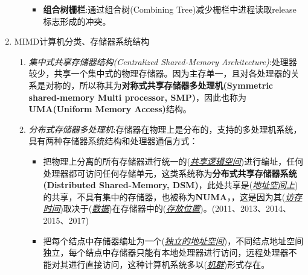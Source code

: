 \documentclass[a4paper]{ctexart}
\newcommand{\blank}[1]{(\emph{\underline{#1}})}
\begin{document}
\begin{enumerate}
\begin{enumerate}
\begin{itemize}
      \item \textbf{组合树栅栏}:通过组合树(Combining Tree)减少栅栏中进程读取release标志形成的冲突。
    \end{itemize}
  \end{enumerate}
  \item MIMD计算机分类、存储器系统结构
  \begin{enumerate}
    \item \emph{集中式共享存储器结构(Centralized Shared-Memory Architecture)}:处理器较少，共享一个集中式的物理存储器。因为主存单一，且对各处理器的关系是对称的，所以称其为\textbf{对称式共享存储器多处理机(Symmetric shared-memory Multi processor, SMP)}，因此也称为\textbf{UMA(Uniform Memory Access)}结构。
    \item \emph{分布式存储器多处理机}:存储器在物理上是分布的，支持的多处理机系统，具有两种存储器系统结构和处理器通信方式：
    \begin{itemize}
      \item 把物理上分离的所有存储器进行统一的\blank{共享逻辑空间}进行编址，任何处理器都可访问任何存储单元，这类系统称为\textbf{分布式共享存储器系统(Distributed Shared-Memory, DSM)}，此处共享是\blank{地址空间上}的共享，不具有集中的存储器，也被称为\textbf{NUMA}，，这是因为其\blank{访存时间}取决于\blank{数据}在存储器中的\blank{存放位置}。(2011、2013、2014、2015、2017)
      \item 把每个结点中存储器编址为一个\blank{独立的地址空间}，不同结点地址空间独立，每个结点中存储器只能有本地处理器进行访问，远程处理器不能对其进行直接访问，这种计算机系统多以\blank{机群}形式存在。
    \end{itemize}
  \end{enumerate}
\end{enumerate}
\end{document}
